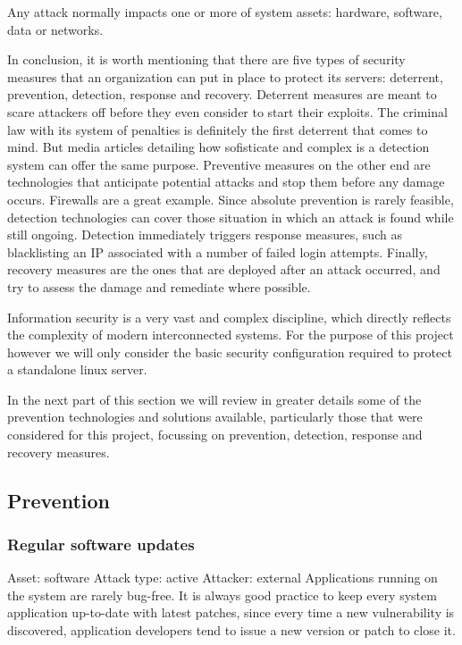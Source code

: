 Any attack normally impacts one or more of system assets: hardware, software,
data or networks.

In conclusion, it is worth mentioning that there are five types of security
measures that an organization can put in place to protect its servers:
deterrent, prevention, detection, response and recovery. Deterrent measures are
meant to scare attackers off before they even consider to start their exploits.
The criminal law with its system of penalties is definitely the first deterrent
that comes to mind. But media articles detailing how sofisticate and complex is
a detection system can offer the same purpose. Preventive measures on the other
end are technologies that anticipate potential attacks and stop them before any
damage occurs. Firewalls are a great example. Since absolute prevention
is rarely feasible, detection technologies can cover those situation in
which an attack is found while still ongoing. Detection immediately
triggers response measures, such as blacklisting an IP associated with a
number of failed login attempts. Finally, recovery measures are the ones that
are deployed after an attack occurred, and try to assess the damage and
remediate where possible.

Information security is a very vast and complex discipline, which
directly reflects the complexity of modern interconnected systems. For the
purpose of this project however we will only consider the basic security
configuration required to protect a standalone linux server.

In the next part of this section we will review in greater details some of the
prevention technologies and solutions available, particularly those that were
considered for this project, focussing on prevention, detection, response and
recovery measures.

\subsection{Prevention}

\subsubsection{Regular software updates}
Asset: software
Attack type: active
Attacker: external
Applications running on the system are rarely bug-free. It is always good
practice to keep every system application up-to-date with latest patches, since
every time a new vulnerability is discovered, application developers tend
to issue a new version or patch to close it.

